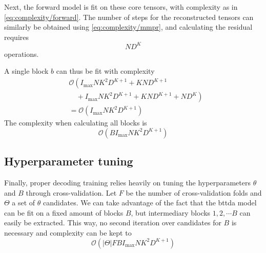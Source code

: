 Next, the forward model is fit on these core tensors, with complexity as in
\cref{eq:complexity/forward}.
The number of steps for the reconstructed tensors can similarly be obtained using
\cref{eq:complexity/mmpr},
and calculating the residual requires
\begin{equation}
	ND^K
\end{equation}
operations.


A single block $b$ can thus be fit with complexity
\begin{equation}
	\begin{split}
		& \mathcal{O}\left(
		I_\text{max}NK^2D^{K+1}
		+ KND^{K+1} \right. \\
		& \left. \quad + I_\text{max}NK^2D^{K+1}
		+ KND^{K+1}
		+ ND^K
		\right) \\
		& = \mathcal{O}\left(I_\text{max}NK^2D^{K+1}\right)
	\end{split}
\end{equation}
The complexity when calculating all blocks is
\begin{equation}
	\mathcal{O}\left(BI_\text{max}NK^2D^{K+1}\right)
\end{equation}

\subsection{Hyperparameter tuning}
Finally, proper decoding training relies heavily on tuning the hyperparameters
$\theta$ and $B$ through cross-validation.
Let $F$ be the number of cross-validation folds and $\Theta$ a set of $\theta$
candidates.
We can take advantage of the fact that the \ac{bttda} model can be fit on a fixed
amount of blocks $B$, but intermediary blocks $1, 2, \cdots B$ can easily be extracted.
This way, no second iteration over candidates for $B$ is necessary and complexity
can be kept to
\begin{equation}
	\mathcal{O}\left(\left|\Theta\right|FBI_\text{max}NK^2D^{K+1}\right)
\end{equation}
